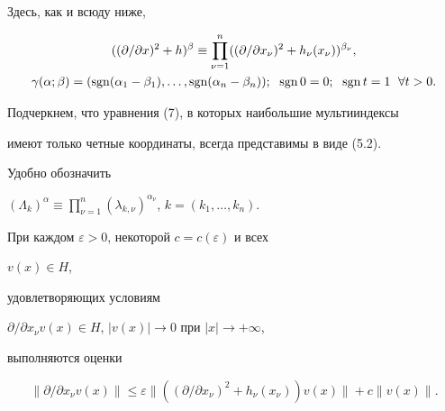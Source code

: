 Здесь, как и всюду ниже, 


\begin{gather*} 


((\partial/\partial x)^2+h)^\beta\equiv\prod^n_{\nu=1} 


((\partial/\partial x_\nu)^2+h_\nu(x_\nu))^{\beta_\nu},\\


\gamma(\alpha;\beta)=(\sgn(\alpha_1-\beta_1),\dotsc, 


\sgn(\alpha_n-\beta_n));\ \; \sgn 0=0; 


\ \; \sgn t=1 \ \; \forall t>0. 


\end{gather*}  


Подчеркнем, что уравнения (7), в которых наибольшие мультииндексы  


имеют только четные координаты, всегда представимы в виде (5.2). 


 


Удобно обозначить 


$(\Lambda_k)^\alpha\equiv\prod\limits^n_{\nu=1} 


(\lambda_{k,\nu})^{\alpha_\nu}$, $k=(k_1,\dotsc,k_n)$. 


 


\begin{lems} 


При каждом $\varepsilon>0$, некоторой $c=c(\varepsilon)$ и всех 


$v(x)\in H$, 


удовлетворяющих условиям 


$\partial/\partial x_\nu v(x)\in H$, $|v(x)|\to 0$ при $|x|\to+\infty$, 


выполняются оценки 


\begin{equation} 


\|\partial/\partial x_\nu v(x)\|\le\varepsilon\| 


((\partial/\partial x_\nu)^2+h_\nu(x_\nu))v(x)\|+c\|v(x)\|. 


\end{equation} 


\end{lems} 


 


